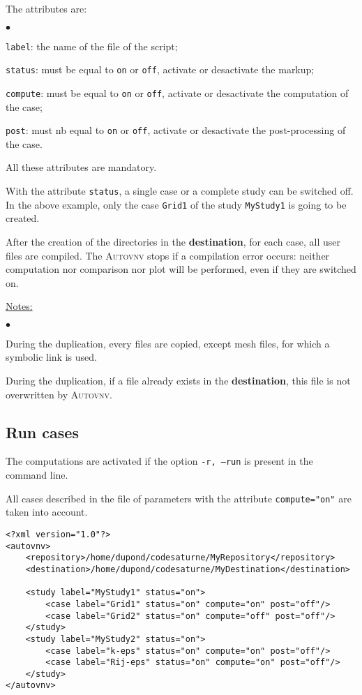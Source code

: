 \documentclass[a4paper,10pt,twoside]{article}
\begin{document}
The attributes are:
\begin{list}{$\bullet$}{}
\item \texttt{label}: the name of the file of the script;
\item \texttt{status}: must be equal to \texttt{on} or \texttt{off},
activate or desactivate the markup;
\item \texttt{compute}: must be equal to \texttt{on} or \texttt{off},
activate or desactivate the computation of the case;
\item \texttt{post}: must nb equal to \texttt{on} or \texttt{off},
activate or desactivate the post-processing of the case.
\end{list}

All these attributes are mandatory.

With the attribute \texttt{status}, a single case or a complete study can be
switched off. In the above example, only the case \texttt{Grid1} of the study
\texttt{MyStudy1} is going to be created.

After the creation of the directories in the \textbf{destination}, for each
case, all user files are compiled. The \textsc{Autovnv} stops if a compilation
error occurs: neither computation nor comparison nor plot will be performed,
even if they are switched on.

\underline{Notes:}

\begin{list}{$\bullet$}{}
\item During the duplication, every files are copied, except mesh files, for
which a symbolic link is used.
\item During the duplication, if a file already exists in the
\textbf{destination}, this file is not overwritten by \textsc{Autovnv}.
\end{list}


\subsection{Run cases}

The computations are activated if the option \texttt{-r, --run} is present in
the command line.

All cases described in the file of parameters with the attribute
\texttt{compute="on"} are taken into account.

\begin{verbatim}
<?xml version="1.0"?>
<autovnv>
    <repository>/home/dupond/codesaturne/MyRepository</repository>
    <destination>/home/dupond/codesaturne/MyDestination</destination>

    <study label="MyStudy1" status="on">
        <case label="Grid1" status="on" compute="on" post="off"/>
        <case label="Grid2" status="on" compute="off" post="off"/>
    </study>
    <study label="MyStudy2" status="on">
        <case label="k-eps" status="on" compute="on" post="off"/>
        <case label="Rij-eps" status="on" compute="on" post="off"/>
    </study>
</autovnv>
\end{verbatim}
\end{document}
